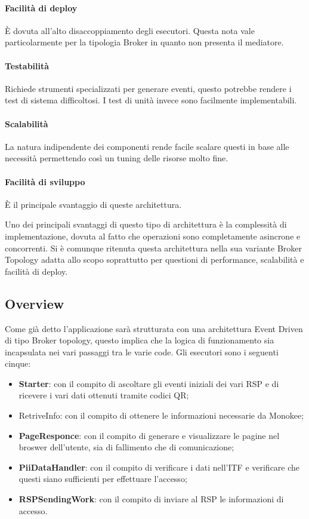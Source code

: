 \paragraph{Facilità di deploy}
È dovuta all’alto disaccoppiamento degli esecutori. Questa nota vale particolarmente per la tipologia Broker in quanto non presenta il mediatore.
\paragraph{Testabilità}
Richiede strumenti specializzati per generare eventi, questo potrebbe rendere i test di sistema difficoltosi. I test di unità invece sono facilmente implementabili. 
\paragraph{Scalabilità}
La natura indipendente dei componenti rende facile scalare questi in base alle necessità permettendo così un tuning delle risorse molto fine.
\paragraph{Facilità di sviluppo }
È il principale svantaggio di queste architettura.


Uno dei principali svantaggi di questo tipo di architettura è la complessità di implementazione, dovuta al fatto che operazioni sono completamente asincrone e concorrenti. Si è comunque ritenuta questa architettura nella sua variante Broker Topology adatta allo scopo soprattutto per questioni di performance, scalabilità e facilità di deploy.

\subsection{Overview}
Come già detto l’applicazione sarà strutturata con una architettura Event Driven di tipo Broker topology, questo implica che la logica di funzionamento sia incapsulata nei vari passaggi tra le varie code.
Gli esecutori sono i seguenti cinque:
\begin{itemize}
    \item \textbf{Starter}: con il compito di ascoltare gli eventi iniziali dei vari RSP e di ricevere i vari dati ottenuti tramite codici QR;
    \item RetriveInfo: con il compito di ottenere le informazioni necessarie da Monokee;
    \item \textbf{PageResponce}: con il compito di generare e visualizzare le pagine nel broswer dell’utente, sia di fallimento che di comunicazione;
    \item \textbf{PiiDataHandler}: con il compito di verificare i dati nell’ITF e verificare che questi siano sufficienti per effettuare l’accesso;
    \item \textbf{RSPSendingWork}: con il compito di inviare al RSP le informazioni di accesso.
\end{itemize}
    
